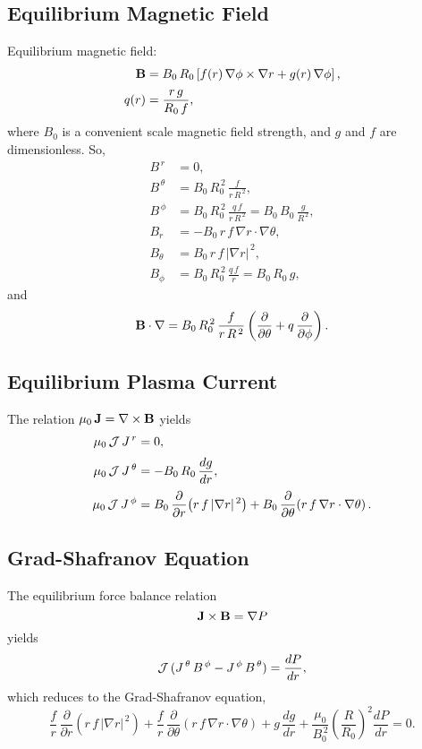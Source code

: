 \documentclass[notitlepage,12pt]{article}
\begin{document}
\subsection{Equilibrium Magnetic Field}
Equilibrium magnetic field:
\begin{align}
{\bf B}& =B_0\,R_0\left[ f(r)\,\nabla\phi\times \nabla r + g(r)\,\nabla\phi\right],\\[0.5ex]
q(r)&= \frac{r\,g}{R_0\,f},
\end{align}
where $B_0$ is a convenient scale magnetic field strength, and $g$ and $f$ are dimensionless.
So,
\begin{align}
B^{\,r} &=0,\\[0.5ex]
B^{\,\theta}&=B_0\,R_0^{\,2}\, \frac{f}{r\,R^{\,2}},\\[0.5ex]
B^{\,\phi} &= B_0\,R_0^{\,2}\,\frac{q\,f}{r\,R^{\,2}}= B_0\,B_0\,\frac{g}{R^{\,2}},\\[0.5ex]
B_r&= - B_0\,r\,f\,\nabla r\cdot\nabla\theta,\\[0.5ex]
B_\theta &= B_0\,r\,f\,|\nabla r|^{\,2},\\[0.5ex]
B_\phi &= B_0\,R_0^{\,2}\,\frac{q\,f}{r} = B_0\,R_0\,g,
\end{align}
and
\begin{equation}
{\bf B}\cdot\nabla = B_0\,R_0^{\,2}\,
\frac{f}{r\,R^{\,2}}\left(\frac{\partial}{\partial \theta}+q\,\frac{\partial}{\partial\phi}\right).
\end{equation}

\subsection{Equilibrium Plasma Current}
The relation $\mu_0\,{\bf J} = \nabla\times{\bf B}$ yields 
\begin{align}
\mu_0\,{\cal J}\,J^{\,r}&= 0,\\[0.5ex]
\mu_0\,{\cal J}\,J^{\,\theta} &= - B_0\,R_0\,\frac{dg}{dr},\\[0.5ex]
\mu_0\,{\cal J}\,J^{\,\phi} &= B_0\,\frac{\partial}{\partial r}\!\left(r\,f\,|\nabla r|^{\,2}\right) +B_0\,\frac{\partial}{\partial\theta}\!\left(r\,f\,\nabla r\cdot\nabla\theta\right).
\end{align} 

\subsection{Grad-Shafranov Equation}
The equilibrium force balance relation
\begin{equation}
{\bf J}\times{\bf B} = \nabla P
\end{equation}
yields
\begin{equation}
{\cal J}\,(J^{\,\theta}\,B^{\,\phi}- J^{\,\phi}\,B^{\,\theta})= \frac{dP}{dr},
\end{equation}
which reduces to the Grad-Shafranov equation, 
\begin{equation} 
\frac{f}{r}\,\frac{\partial}{\partial r}\!\left(r\,f\,|\nabla r|^{\,2}\right) + \frac{f}{r}\,\frac{\partial}{\partial \theta}\!\left(r\,f\,\nabla r\cdot\nabla\theta\right) + g\,\frac{dg}{dr} + \frac{\mu_0}{B_0^{\,2}}\left(\frac{R}{R_0}\right)^2\frac{dP}{dr} = 0.
\end{equation}
\end{document}
